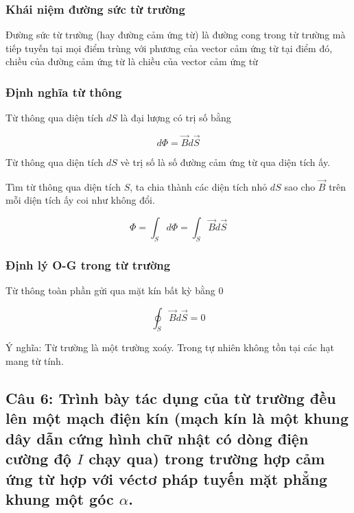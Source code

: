 \subsubsection{Khái niệm đường sức từ trường}

Đường sức từ trường (hay đường cảm ứng từ) là đường cong trong từ trường mà tiếp tuyến tại mọi điểm trùng với phương của vector cảm ứng từ tại điểm đó, chiều của đường cảm ứng từ là chiều của vector cảm ứng từ

\subsubsection{Định nghĩa từ thông}

Từ thông qua diện tích $dS$ là đại lượng có trị số bằng 

\begin{equation*}
  d\Phi = \vec{B}d\vec{S}
\end{equation*}

Từ thông qua diện tích $dS$ vè trị số là số đường cảm ứng từ qua diện tích ấy.

Tìm từ thông qua diện tích $S$, ta chia thành các diện tích nhỏ $dS$ sao cho $\vec{B}$ trên mỗi diện tích ấy coi như không đổi.

\begin{equation*}
  \Phi = \int_S d\Phi = \int_S \vec{B}d\vec{S}
\end{equation*}

\subsubsection{Định lý O-G trong từ trường}

Từ thông toàn phần gửi qua mặt kín bất kỳ bằng 0

\begin{equation*}
  \oint_S \vec{B}d\vec{S} = 0
\end{equation*}

Ý nghĩa: Từ trường là một trường xoáy. Trong tự nhiên không tồn tại các hạt mang từ tính.

\subsection[Câu 6]{Câu 6: Trình bày tác dụng của từ trường đều lên một mạch điện kín (mạch kín là một khung dây dẫn cứng hình chữ nhật có dòng điện cường độ $I$ chạy qua) trong trường hợp cảm ứng từ hợp với véctơ pháp tuyến mặt phẳng khung một góc $\alpha$.}

